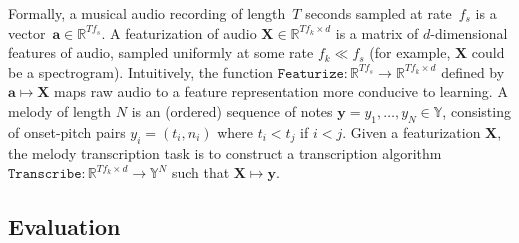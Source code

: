 Formally, a musical audio recording of length~$T$ seconds sampled at rate~$f_s$ is a vector~${\bm{a} \in \mathbb{R}^{Tf_s}}$. 
A featurization of audio ${\bm{X} \in \mathbb{R}^{Tf_k \times d}}$ is a matrix of $d$-dimensional features of audio, sampled uniformly at some rate ${f_k \ll f_s}$ (for example, $\bm{X}$ could be a spectrogram).
Intuitively, the function ${\texttt{Featurize} : \mathbb{R}^{Tf_s} \to \mathbb{R}^{Tf_k \times d}}$ defined by ${\bm{a} \mapsto \bm{X}}$ maps 
raw audio 
to a feature representation more conducive to learning. 
A melody of length $N$ is an (ordered) sequence of notes 
${\bm{y} = y_1,\dots,y_N \in \mathbb{Y}}$, 
consisting of onset-pitch pairs ${y_i = (t_i,n_i)}$ where ${t_i < t_j}$ if ${i < j}$. Given a featurization $\bm{X}$, the melody transcription task is to construct a transcription algorithm ${\texttt{Transcribe} : \mathbb{R}^{Tf_k \times d} \to \mathbb{Y}^N}$ such that ${\bm{X} \mapsto \bm{y}}$.




\subsection{Evaluation}
\label{sec:eval}


